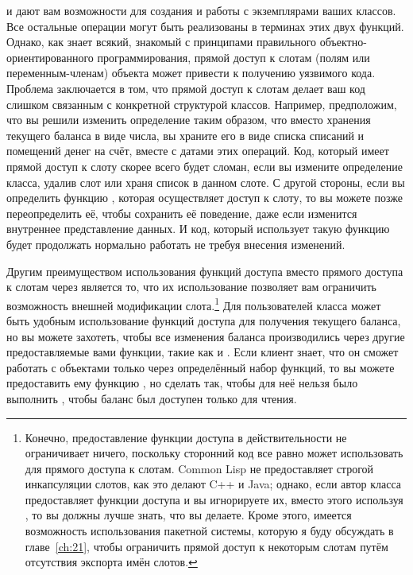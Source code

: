  и  дают вам возможности для создания и работы с
экземплярами ваших классов.  Все остальные операции могут быть реализованы в терминах этих
двух функций.  Однако, как знает всякий, знакомый с принципами правильного
объектно-ориентированного программирования, прямой доступ к слотам (полям или
переменным-членам) объекта может привести к получению уязвимого кода.  Проблема
заключается в том, что прямой доступ к слотам делает ваш код слишком связанным с
конкретной структурой классов.  Например, предположим, что вы решили изменить определение
 таким образом, что вместо хранения текущего баланса в виде числа, вы
храните его в виде списка списаний и помещений денег на счёт, вместе с датами этих
операций.  Код, который имеет прямой доступ к слоту  скорее всего будет
сломан, если вы измените определение класса, удалив слот или храня список в данном
слоте. С другой стороны, если вы определить функцию , которая осуществляет
доступ к слоту, то вы можете позже переопределить её, чтобы сохранить её поведение, даже
если изменится внутреннее представление данных.  И код, который использует такую функцию
будет продолжать нормально работать не требуя внесения изменений.

Другим преимуществом использования функций доступа вместо прямого доступа к слотам через
 является то, что их использование позволяет вам ограничить возможность
внешней модификации слота.\footnote{Конечно, предоставление функции доступа в
  действительности не ограничивает ничего, поскольку сторонний код все равно может
  использовать  для прямого доступа к слотам. Common Lisp не
  предоставляет строгой инкапсуляции слотов, как это делают C++ и Java; однако, если автор
  класса предоставляет функции доступа и вы игнорируете их, вместо этого используя
  , то вы должны лучше знать, что вы делаете.  Кроме этого, имеется
  возможность использования пакетной системы, которую я буду обсуждать в
  главе~\ref{ch:21}, чтобы ограничить прямой доступ к некоторым слотам путём отсутствия
экспорта имён слотов.} Для пользователей класса  может быть удобным
использование функций доступа для получения текущего баланса, но вы можете захотеть, чтобы
все изменения баланса производились через другие предоставляемые вами функции, такие как
 и .  Если клиент знает, что он сможет работать с объектами
только через определённый набор функций, то вы можете предоставить ему функцию
, но сделать так, чтобы для неё нельзя было выполнить , чтобы
баланс был доступен только для чтения.

